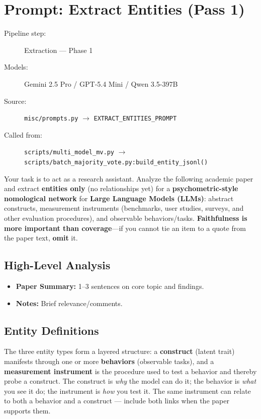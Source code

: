 \section*{Prompt: Extract Entities (Pass 1)}
\begin{description}
\item[Pipeline step:] Extraction --- Phase 1
\item[Models:] Gemini 2.5 Pro / GPT-5.4 Mini / Qwen 3.5-397B
\item[Source:] \texttt{misc/prompts.py} $\rightarrow$ \texttt{EXTRACT\_ENTITIES\_PROMPT}
\item[Called from:] \texttt{scripts/multi\_model\_mv.py} $\rightarrow$ \texttt{scripts/batch\_majority\_vote.py:build\_entity\_jsonl()}
\end{description}

\begin{tcolorbox}[breakable,enhanced,colback=blue!3,colframe=blue!40!black,title={Prompt},fonttitle=\bfseries,left=8pt,right=8pt,top=6pt,bottom=6pt]

Your task is to act as a research assistant. Analyze the following academic paper and extract \textbf{entities only} (no relationships yet) for a \textbf{psychometric-style nomological network} for \textbf{Large Language Models (LLMs)}: abstract constructs, measurement instruments (benchmarks, user studies, surveys, and other evaluation procedures), and observable behaviors/tasks. \textbf{Faithfulness is more important than coverage}---if you cannot tie an item to a quote from the paper text, \textbf{omit} it.

\subsection*{High-Level Analysis}
\begin{itemize}
\item \textbf{Paper Summary:} 1--3 sentences on core topic and findings.
\item \textbf{Notes:} Brief relevance/comments.
\end{itemize}

\subsection*{Entity Definitions}

The three entity types form a layered structure: a \textbf{construct} (latent trait) manifests through one or more \textbf{behaviors} (observable tasks), and a \textbf{measurement instrument} is the procedure used to test a behavior and thereby probe a construct. The construct is \textit{why} the model can do it; the behavior is \textit{what} you see it do; the instrument is \textit{how} you test it. The same instrument can relate to both a behavior and a construct --- include both links when the paper supports them.


\end{tcolorbox}
